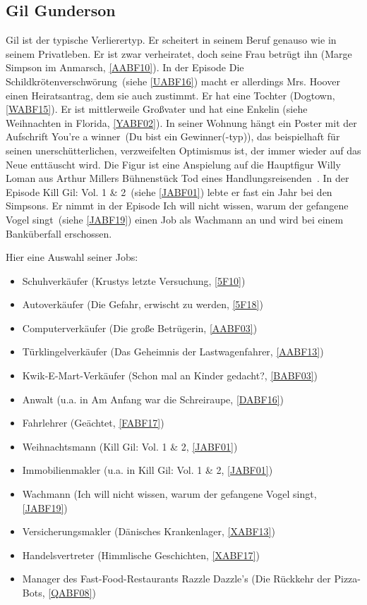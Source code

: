 {\subsection{Gil Gunderson}\label{GilGunderson}
Gil ist der typische Verlierertyp. Er scheitert in seinem Beruf genauso wie in seinem Privatleben. Er ist zwar verheiratet, doch seine Frau betrügt ihn (\glqq Marge Simpson im Anmarsch\grqq, \ref{AABF10}). In der Episode \glqq Die Schildkrötenverschwörung\grqq\ (siehe \ref{UABF16}) macht er allerdings Mrs. Hoover einen Heiratsantrag, dem sie auch zustimmt. Er hat eine Tochter (\glqq Dogtown\grqq, \ref{WABF15}). Er ist mittlerweile Großvater und hat eine Enkelin (siehe \glqq Weihnachten in Florida\grqq, \ref{YABF02}). In seiner Wohnung hängt ein Poster mit der Aufschrift \glqq You're a winner\grqq\ (\glqq Du bist ein Gewinner(-typ)\grqq ), das beispielhaft für seinen unerschütterlichen, verzweifelten Optimismus ist, der immer wieder auf das Neue enttäuscht wird. Die Figur ist eine Anspielung auf die Hauptfigur Willy Loman aus Arthur Millers Bühnenstück \glqq Tod eines Handlungsreisenden\grqq\ \cite{Wikipedia}. In der Episode \glqq Kill Gil: Vol. 1 \& 2\grqq\ (siehe \ref{JABF01}) lebte er fast ein Jahr bei den Simpsons. Er nimmt in der Episode \glqq Ich will nicht wissen, warum der gefangene Vogel singt\grqq\ (siehe \ref{JABF19}) einen Job als Wachmann an und wird bei einem Banküberfall erschossen.

Hier eine Auswahl seiner Jobs:
\begin{itemize}
 	\item Schuhverkäufer (\glqq Krustys letzte Versuchung\grqq , \ref{5F10})
	\item Autoverkäufer (\glqq Die Gefahr, erwischt zu werden\grqq , \ref{5F18})
	\item Computerverkäufer (\glqq Die große Betrügerin\grqq , \ref{AABF03})
	\item Türklingelverkäufer (\glqq Das Geheimnis der Lastwagenfahrer\grqq , \ref{AABF13})
	\item Kwik-E-Mart-Verkäufer (\glqq Schon mal an Kinder gedacht?\grqq , \ref{BABF03})
	\item Anwalt (u.a. in \glqq Am Anfang war die Schreiraupe\grqq , \ref{DABF16})
	\item Fahrlehrer (\glqq Geächtet\grqq , \ref{FABF17})
	\item Weihnachtsmann (\glqq Kill Gil: Vol. 1 \& 2\grqq, \ref{JABF01})
	\item Immobilienmakler (u.a. in \glqq Kill Gil: Vol. 1 \& 2\grqq, \ref{JABF01})
	\item Wachmann (\glqq Ich will nicht wissen, warum der gefangene Vogel singt\grqq , \ref{JABF19})
	\item Versicherungsmakler (\glqq Dänisches Krankenlager\grqq, \ref{XABF13})
	\item Handelsvertreter (\glqq Himmlische Geschichten\grqq, \ref{XABF17})
	\item Manager des Fast-Food-Restaurants Razzle Dazzle's (\glqq Die Rückkehr der Pizza-Bots\grqq, \ref{QABF08})
\end{itemize}


}

